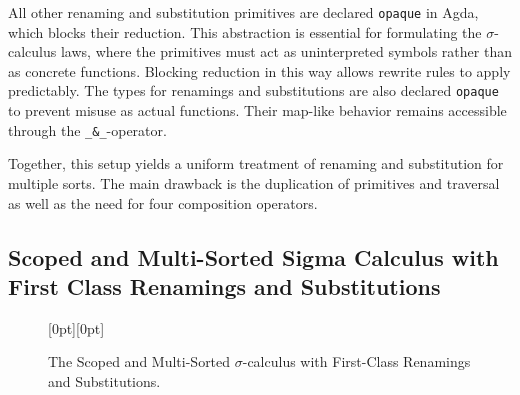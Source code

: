 \documentclass[screen,nonacm]{acmart}
\begin{document}
All other renaming and substitution primitives are declared \texttt{opaque} in
Agda, which blocks their reduction. This abstraction is essential for
formulating the $\sigma$-calculus laws, where the primitives must act as
uninterpreted symbols rather than as concrete functions. Blocking reduction in
this way allows rewrite rules to apply predictably. The types for renamings and
substitutions are also declared \texttt{opaque} to prevent misuse as actual
functions. Their map-like behavior remains accessible through the
\texttt{\_\&\_}-operator.

Together, this setup yields a uniform treatment of renaming and substitution
for multiple sorts. The main drawback is the duplication of primitives and
traversal as well as the need for four composition operators.

\subsection{Scoped and Multi-Sorted Sigma Calculus with First Class Renamings and Substitutions}
\begin{figure}[h]
      \centering

      \begin{minipage}[t]{0.38\linewidth}
            \raggedright{}
            \EDefLaws{}
      \end{minipage}
      \hfill
      \begin{minipage}[t]{0.58\linewidth}
            \raggedright{}
            \EMonadLaws{}
      \end{minipage}

      \vspace{1em}
      \begin{minipage}[t]{0.38\linewidth}
            \raggedright{}
            \ERewriteSys{}
      \end{minipage}
      \hfill
      \raisebox{5.0em}[0pt][0pt]{%
            \begin{minipage}[t]{0.58\linewidth}
                  \raggedright{}
                  \EInteractLaws{}
            \end{minipage}
      }
      \caption{The Scoped and Multi-Sorted $\sigma$-calculus with First-Class Renamings and Substitutions.}
      \label{fig:six-frame-layout}
\end{figure}
\end{document}
